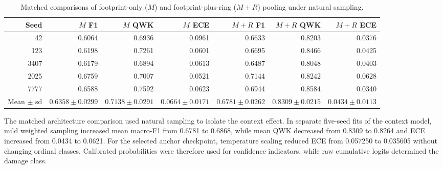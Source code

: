 \begin{table}[t]
\centering
\caption{Matched comparisons of footprint-only ($M$) and footprint-plus-ring ($M+R$) pooling under natural sampling.}
\label{tab:stage2b_pairs}
\scriptsize
\setlength{\tabcolsep}{2pt}
\begin{tabular}{rrrrrrr}
\toprule
Seed & $M$ F1 & $M$ QWK & $M$ ECE & $M+R$ F1 & $M+R$ QWK & $M+R$ ECE \\
\midrule
42 & 0.6064 & 0.6936 & 0.0961 & 0.6633 & 0.8203 & 0.0376 \\
123 & 0.6198 & 0.7261 & 0.0601 & 0.6695 & 0.8466 & 0.0425 \\
3407 & 0.6179 & 0.6894 & 0.0613 & 0.6487 & 0.8048 & 0.0403 \\
2025 & 0.6759 & 0.7007 & 0.0521 & 0.7144 & 0.8242 & 0.0628 \\
7777 & 0.6588 & 0.7592 & 0.0623 & 0.6944 & 0.8584 & 0.0340 \\
\midrule
Mean $\pm$ sd & $0.6358\!\pm\!0.0299$ & $0.7138\!\pm\!0.0291$ & $0.0664\!\pm\!0.0171$ & $0.6781\!\pm\!0.0262$ & $0.8309\!\pm\!0.0215$ & $0.0434\!\pm\!0.0113$ \\
\bottomrule
\end{tabular}
\end{table}

The matched architecture comparison used natural sampling to isolate the context effect. In separate five-seed fits of the context model, mild weighted sampling increased mean macro-F1 from 0.6781 to 0.6868, while mean QWK decreased from 0.8309 to 0.8264 and ECE increased from 0.0434 to 0.0621. For the selected anchor checkpoint, temperature scaling reduced ECE from 0.057250 to 0.035605 without changing ordinal classes. Calibrated probabilities were therefore used for confidence indicators, while raw cumulative logits determined the damage class.


